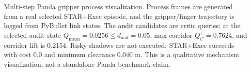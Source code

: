 Multi-step Panda gripper process visualization. Process frames are generated from a real selected STAR+Exec episode, and the gripper/finger trajectory is logged from PyBullet link states. The audit candidates are critic queries; at the selected audit state $Q_\mathrm{mean}=0.0256\le d_\mathrm{aud}=0.05$, max corridor $Q_C^+=0.7624$, and corridor lift is 0.2154. Risky shadows are not executed; STAR+Exec succeeds with cost 0.0 and minimum clearance 0.040 m. This is a qualitative mechanism visualization, not a standalone Panda benchmark claim.
